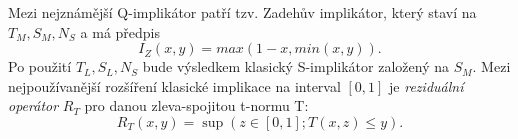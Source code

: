 \begin{graph}

\end{graph}

Mezi nejznámější Q-implikátor patří tzv. Zadeh\r uv implikátor, který staví na $T_M, S_M, N_S$ a má předpis $$I_Z(x,y) = max(1-x, min(x,y)).$$ Po použití $T_L, S_L, N_S$ bude výsledkem klasický S-implikátor založený na $S_M.$
Mezi nejpoužívanější rozšíření klasické implikace na interval $[0,1]$ je \textit{reziduální operátor} $R_T$ pro danou zleva-spojitou t-normu T: $$ R_T(x,y)=\sup(z \in [0,1]; T(x,z) \leq y).$$

